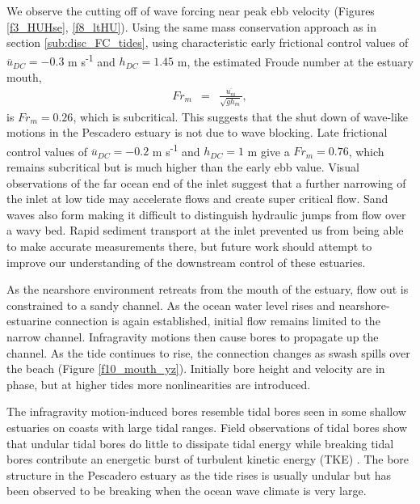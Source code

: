 We observe the cutting off of wave forcing near peak ebb velocity
(Figures \ref{f3_HUHse}, \ref{f8_ltHU}). Using the same mass conservation
approach as in section \ref{sub:disc_FC_tides}, using characteristic
early frictional control values of $\overline{{u}}{}_{DC}=-0.3$ m
s\textsuperscript{-1} and $h_{DC}=1.45$ m, the estimated Froude
number at the estuary mouth,
\begin{eqnarray}
Fr_{m} & = & \frac{\overline{u_{m}}}{\sqrt{gh_{m}}},\label{eq:Fr}
\end{eqnarray}
is $Fr_{m}=0.26$, which is subcritical. This suggests that the shut
down of wave-like motions in the Pescadero estuary is not due to wave
blocking. Late frictional control values of $\overline{{u}}{}_{DC}=-0.2$
m s\textsuperscript{-1} and $h_{DC}=1$ m give a $Fr_{m}=0.76$,
which remains subcritical but is much higher than the early ebb value.
Visual observations of the far ocean end of the inlet suggest that
a further narrowing of the inlet at low tide may accelerate
flows and create super critical flow. Sand waves also form making
it difficult to distinguish hydraulic jumps from flow over a wavy
bed. Rapid sediment transport at the inlet prevented us from being
able to make accurate measurements there, but future work should attempt
to improve our understanding of the downstream control of these estuaries. 

As the nearshore environment retreats from the mouth of the estuary,
flow out is constrained to a sandy channel. As the ocean water level
rises and nearshore-estuarine connection is again established, initial
flow remains limited to the narrow channel. Infragravity motions then
cause bores to propagate up the channel. As the tide continues to
rise, the connection changes as swash spills over the beach (Figure
\ref{f10_mouth_yz}). Initially bore height and velocity are in phase,
but at higher tides more nonlinearities are introduced.

The infragravity motion-induced bores resemble tidal bores seen in
some shallow estuaries on coasts with large tidal ranges. Field observations
of tidal bores show that undular tidal bores do little to dissipate
tidal energy \parencite{wolanski_undular_2004} while breaking tidal bores
contribute an energetic burst of turbulent kinetic energy (TKE) \parencite{simpson_reynolds_2004}. The bore structure in the Pescadero estuary as the tide rises is usually undular but has been observed to be breaking when the ocean wave climate is very large. 



